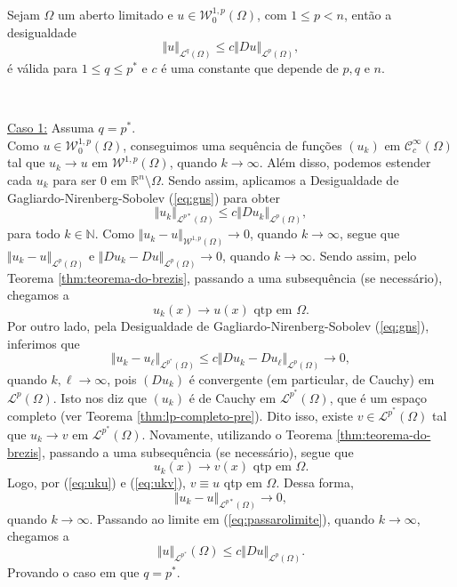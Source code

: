 \documentclass[a4paper, 11pt]{book}
\theoremstyle{definition}
\newcommand{\bN}{\mathbb{N}}
\newcommand{\bR}{\mathbb{R}}
\newcommand{\cC}{\mathcal{C}}
\newcommand{\cL}{\mathcal{L}}
\newcommand{\cW}{\mathcal{W}}
\begin{document}
\begin{tbox} \label{thm:poincaregen}
    Sejam $\Omega$ um aberto limitado e $u \in \cW^{1,p}_0(\Omega)$, com $1 \leqslant p < n$, então a desigualdade
    \begin{equation} \label{eq:poincaregen}
        \Vert u \Vert_{\cL^q(\Omega)} \leqslant c \Vert Du \Vert_{\cL^p(\Omega)},
    \end{equation}
    é válida para $1 \leqslant q \leqslant p^*$ e $c$ é uma constante que depende de $p, q$ e $n$.
\end{tbox}
\begin{prf} ~

    \underline{Caso 1:} Assuma $q = p^*$.\\
    Como $u \in \cW^{1,p}_0(\Omega)$, conseguimos uma sequência de funções $(u_k)$ em $\cC^{\infty}_c(\Omega)$ tal que $u_k \to u$ em $\cW^{1,p}(\Omega)$, quando $k \to \infty$.
    Além disso, podemos estender cada $u_k$ para ser $0$ em $\bR^n \setminus \Omega$.
    Sendo assim, aplicamos a Desigualdade de Gagliardo-Nirenberg-Sobolev (\ref{eq:gns}) para obter
    \begin{equation} \label{eq:passarolimite}
        \Vert u_k \Vert_{\cL^{p*}(\Omega)} \leqslant c \Vert Du_k \Vert_{\cL^p(\Omega)},
    \end{equation}
    para todo $k \in \bN$.
    Como $\Vert u_k - u \Vert_{\cW^{1,p}(\Omega)} \to 0$, quando $k \to \infty$, segue que $\Vert u_k - u \Vert_{\cL^p(\Omega)}$ e $\Vert Du_k - Du \Vert_{\cL^p(\Omega)} \to 0$, quando $k \to \infty$.
    Sendo assim, pelo Teorema \ref{thm:teorema-do-brezis}, passando a uma subsequência (se necessário), chegamos a
    \begin{equation} \label{eq:uku}
        u_k(x) \to u(x) \text{ qtp em } \Omega.
    \end{equation}
    Por outro lado, pela Desigualdade de Gagliardo-Nirenberg-Sobolev (\ref{eq:gns}), inferimos que
    \[
        \Vert u_k - u_\ell \Vert_{\cL^{p^*}(\Omega)} \leqslant c \Vert Du_k - Du_\ell \Vert_{\cL^p(\Omega)} \to 0,
    \]
    quando $k,\ell \to \infty$, pois $(Du_k)$ é convergente (em particular, de Cauchy) em $\cL^p(\Omega)$. Isto nos diz que $(u_k)$ é de Cauchy em $\cL^{p^*}(\Omega)$, que é um espaço completo (ver Teorema \ref{thm:lp-completo-pre}). Dito isso, existe $v \in \cL^{p^*}(\Omega)$ tal que $u_k \to v$ em $\cL^{p^*}(\Omega)$.
    Novamente, utilizando o Teorema \ref{thm:teorema-do-brezis}, passando a uma subsequência (se necessário), segue que
    \begin{equation} \label{eq:ukv}
        u_k(x) \to v(x) \text{ qtp em } \Omega.
    \end{equation}
    Logo, por (\ref{eq:uku}) e (\ref{eq:ukv}), $v \equiv u$ qtp em $\Omega$.
    Dessa forma,
    \[
        \Vert u_k - u \Vert_{\cL^{p*}(\Omega)} \to 0,
    \]
    quando $k \to \infty$.
    Passando ao limite em (\ref{eq:passarolimite}), quando $k\to\infty$, chegamos a
    \[
        \Vert u \Vert_{\cL^{p^*}}(\Omega) \leqslant c \Vert Du \Vert_{\cL^p(\Omega)}.
    \]
    Provando o caso em que $q = p^*$. 
    

\end{prf}
\end{document}
